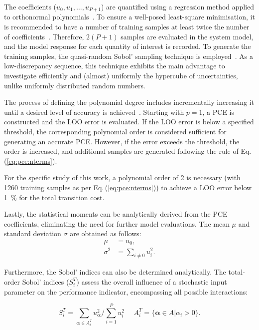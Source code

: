 \documentclass[11pt,twoside,a4paper,english]{article}
\begin{document}
\begin{appendices}
The coefficients ($u_0, u_1, \dots, u_{P+1}$) are quantified using a regression method applied to orthonormal polynomials~\cite{Sudret2014}. To ensure a well-posed least-square minimisation, it is recommended to have a number of training samples at least twice the number of coefficients~\cite{Sudret2014}. Therefore, $2 \left( P+1 \right)$ samples are evaluated in the system model, and the model response for each quantity of interest is recorded. To generate the training samples, the quasi-random Sobol' sampling technique is employed~\cite{bratley2003implementing}. As a low-discrepancy sequence, this technique exhibits the main advantage to investigate efficiently and (almost) uniformly the hypercube of uncertainties, unlike uniformly distributed random numbers.\par

The process of defining the polynomial degree includes incrementally increasing it until a desired level of accuracy is achieved~\cite{coppitters2022rheia}. Starting with $p=1$, a PCE is constructed and the \gls{LOO} error is evaluated. If the \gls{LOO} error is below a specified threshold, the corresponding polynomial order is considered sufficient for generating an accurate PCE. However, if the error exceeds the threshold, the order is increased, and additional samples are generated following the rule of Eq.\,(\ref{eq:pce:nterms}).

For the specific study of this work, a polynomial order of 2 is necessary (with 1260 training samples as per Eq.\,(\ref{eq:pce:nterms})) to achieve a \gls{LOO} error below \SI{1}{\%} for the total transition cost.\par

Lastly, the statistical moments can be analytically derived from the PCE coefficients, eliminating the need for further model evaluations. The mean $\mu$ and standard deviation $\sigma$ are obtained as follows:
\begin{align}
\mu &= u_0,\\
\sigma^2 &= \sum_{i \neq 0 } u_{i}^2 .
\label{eq:pce:statmom}
\end{align}

Furthermore, the Sobol' indices can also be determined analytically. The total-order Sobol' indices ($S_i^{T}$) assess the overall influence of a stochastic input parameter on the performance indicator, encompassing all possible interactions:

\begin{equation}
S_i^{T} = \sum_{\bm{\alpha} \in A_i^T}^{} u_{\bm{\alpha}}^2/\sum_{i=1}^P u_i^2 ~~~~~~ A_i^T = \{\bm{\alpha} \in A | \alpha_i > 0\}.
\end{equation}


\end{appendices}
\end{document}
